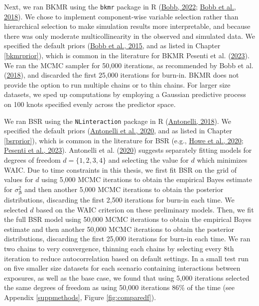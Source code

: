 \documentclass[12pt, twoside]{amherstthesis}
\begin{document}
Next, we ran BKMR using the \texttt{bkmr} package in R (\protect\hyperlink{ref-bobb_bkmr_2022}{Bobb, 2022}; \protect\hyperlink{ref-bobb_statistical_2018}{Bobb et al., 2018}). We chose to implement component-wise variable selection rather than hierarchical selection to make simulation results more interpretable, and because there was only moderate multicollinearity in the observed and simulated data. We specified the default priors (\protect\hyperlink{ref-bobb_bayesian_2015}{Bobb et al., 2015}, and as listed in Chapter \ref{bkmrprior}), which is common in the literature for BKMR Pesenti et al. (\protect\hyperlink{ref-pesenti_comparative_2023}{2023}). We ran the MCMC sampler for 50,000 iterations, as recommended by Bobb et al. (\protect\hyperlink{ref-bobb_statistical_2018}{2018}), and discarded the first 25,000 iterations for burn-in. BKMR does not provide the option to run multiple chains or to thin chains. For larger size datasets, we sped up computations by employing a Gaussian predictive process on 100 knots specified evenly across the predictor space.

We ran BSR using the \texttt{NLinteraction} package in R (\protect\hyperlink{ref-antonelli_nlinteraction_2018}{Antonelli, 2018}). We specified the default priors (\protect\hyperlink{ref-antonelli_estimating_2020}{Antonelli et al., 2020}, and as listed in Chapter \ref{bsrprior}), which is common in the literature for BSR (e.g., \protect\hyperlink{ref-howe_prenatal_2020}{Howe et al., 2020}; \protect\hyperlink{ref-pesenti_comparative_2023}{Pesenti et al., 2023}). Antonelli et al. (\protect\hyperlink{ref-antonelli_estimating_2020}{2020}) suggests separately fitting models for degrees of freedom \(d=\{1, 2, 3, 4\}\) and selecting the value for \(d\) which minimizes WAIC. Due to time constraints in this thesis, we first fit BSR on the grid of values for \(d\) using 5,000 MCMC iterations to obtain the empirical Bayes estimate for \(\sigma^2_{\boldsymbol\beta}\) and then another 5,000 MCMC iterations to obtain the posterior distributions, discarding the first 2,500 iterations for burn-in each time. We selected \(d\) based on the WAIC criterion on these preliminary models. Then, we fit the full BSR model using 50,000 MCMC iterations to obtain the empirical Bayes estimate and then another 50,000 MCMC iterations to obtain the posterior distributions, discarding the first 25,000 iterations for burn-in each time. We ran two chains to very convergence, thinning each chains by selecting every 8th iteration to reduce autocorrelation based on default settings. In a small test run on five smaller size datasets for each scenario containing interactions between exposures, as well as the base case, we found that using 5,000 iterations selected the same degrees of freedom as using 50,000 iterations 86\% of the time (see Appendix \ref{suppmethods}, Figure \ref{fig:comparedf}).
\end{document}
